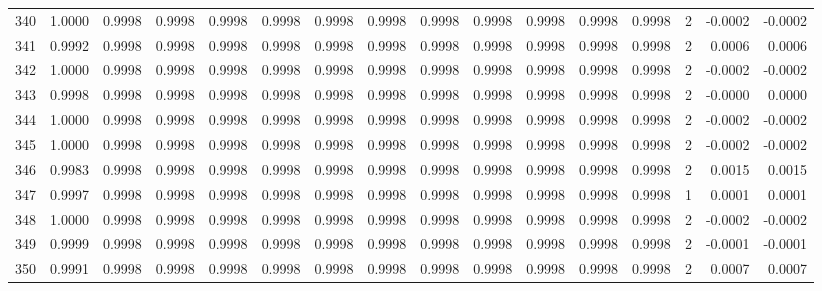 \begin{tabular}{lrrrrrrrrrrrrrrr}
340 &      1.0000 &  0.9998 &  0.9998 &  0.9998 &  0.9998 &  0.9998 &  0.9998 &  0.9998 &  0.9998 &  0.9998 &   0.9998 &     0.9998 &      2 &                   -0.0002 &                    -0.0002 \\
341 &      0.9992 &  0.9998 &  0.9998 &  0.9998 &  0.9998 &  0.9998 &  0.9998 &  0.9998 &  0.9998 &  0.9998 &   0.9998 &     0.9998 &      2 &                    0.0006 &                     0.0006 \\
342 &      1.0000 &  0.9998 &  0.9998 &  0.9998 &  0.9998 &  0.9998 &  0.9998 &  0.9998 &  0.9998 &  0.9998 &   0.9998 &     0.9998 &      2 &                   -0.0002 &                    -0.0002 \\
343 &      0.9998 &  0.9998 &  0.9998 &  0.9998 &  0.9998 &  0.9998 &  0.9998 &  0.9998 &  0.9998 &  0.9998 &   0.9998 &     0.9998 &      2 &                   -0.0000 &                     0.0000 \\
344 &      1.0000 &  0.9998 &  0.9998 &  0.9998 &  0.9998 &  0.9998 &  0.9998 &  0.9998 &  0.9998 &  0.9998 &   0.9998 &     0.9998 &      2 &                   -0.0002 &                    -0.0002 \\
345 &      1.0000 &  0.9998 &  0.9998 &  0.9998 &  0.9998 &  0.9998 &  0.9998 &  0.9998 &  0.9998 &  0.9998 &   0.9998 &     0.9998 &      2 &                   -0.0002 &                    -0.0002 \\
346 &      0.9983 &  0.9998 &  0.9998 &  0.9998 &  0.9998 &  0.9998 &  0.9998 &  0.9998 &  0.9998 &  0.9998 &   0.9998 &     0.9998 &      2 &                    0.0015 &                     0.0015 \\
347 &      0.9997 &  0.9998 &  0.9998 &  0.9998 &  0.9998 &  0.9998 &  0.9998 &  0.9998 &  0.9998 &  0.9998 &   0.9998 &     0.9998 &      1 &                    0.0001 &                     0.0001 \\
348 &      1.0000 &  0.9998 &  0.9998 &  0.9998 &  0.9998 &  0.9998 &  0.9998 &  0.9998 &  0.9998 &  0.9998 &   0.9998 &     0.9998 &      2 &                   -0.0002 &                    -0.0002 \\
349 &      0.9999 &  0.9998 &  0.9998 &  0.9998 &  0.9998 &  0.9998 &  0.9998 &  0.9998 &  0.9998 &  0.9998 &   0.9998 &     0.9998 &      2 &                   -0.0001 &                    -0.0001 \\
350 &      0.9991 &  0.9998 &  0.9998 &  0.9998 &  0.9998 &  0.9998 &  0.9998 &  0.9998 &  0.9998 &  0.9998 &   0.9998 &     0.9998 &      2 &                    0.0007 &                     0.0007 \\

\end{tabular}
